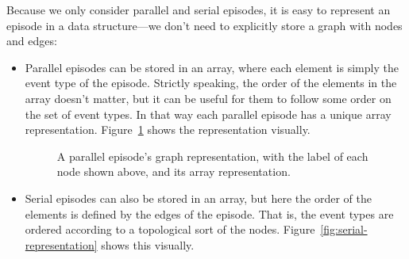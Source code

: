 Because we only consider parallel and serial episodes, it is easy to represent an episode in a data structure---we don't need to explicitly store a graph with nodes and edges:
\begin{itemize}
\item Parallel episodes can be stored in an array, where each element is simply the event type of the episode. Strictly speaking, the order of the elements in the array doesn't matter, but it can be useful for them to follow some order on the set of event types. In that way each parallel episode has a unique array representation. Figure~\ref{fig:parallel-representation} shows the representation visually.


\begin{figure}[h]
\centering


\caption{A parallel episode's graph representation, with the label of each node shown above, and its array representation.}

\label{fig:parallel-representation}
\end{figure}

\item Serial episodes can also be stored in an array, but here the order of the elements is defined by the edges of the episode. That is, the event types are ordered according to a topological sort of the nodes. Figure~\ref{fig:serial-representation} shows this visually.
\end{itemize}

